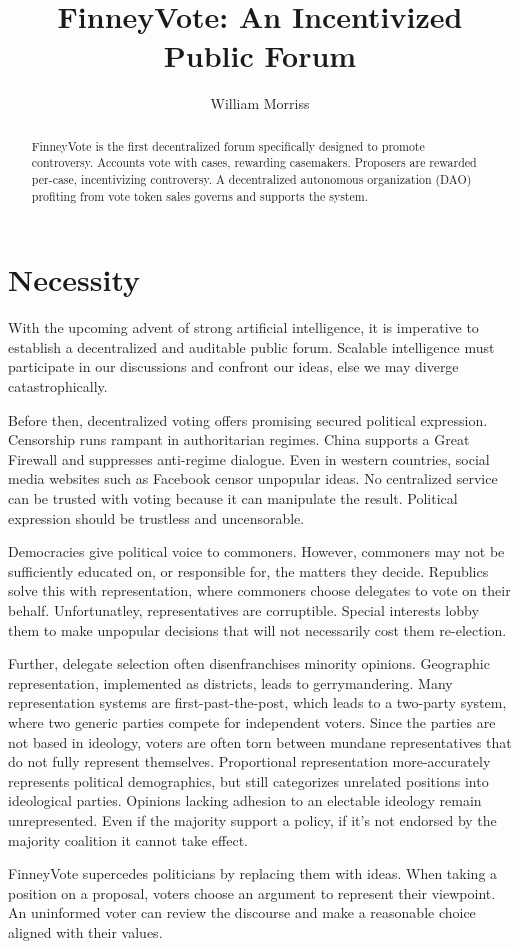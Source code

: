 \documentclass{article}
\title{FinneyVote: An Incentivized Public Forum}
\author{William Morriss}
\begin{document}
\maketitle
\begin{abstract}
FinneyVote is the first decentralized forum specifically designed to promote controversy.
Accounts vote with cases, rewarding casemakers.
Proposers are rewarded per-case, incentivizing controversy.
A decentralized autonomous organization (DAO) profiting from vote token sales governs and supports the system.
\end{abstract}
\section{Necessity}
With the upcoming advent of strong artificial intelligence, it is imperative to establish a decentralized and auditable public forum.
Scalable intelligence must participate in our discussions and confront our ideas, else we may diverge catastrophically.
\par
Before then, decentralized voting offers promising secured political expression.
Censorship runs rampant in authoritarian regimes.
China supports a Great Firewall and suppresses anti-regime dialogue.
Even in western countries, social media websites such as Facebook censor unpopular ideas.
No centralized service can be trusted with voting because it can manipulate the result.
Political expression should be trustless and uncensorable.
\par
Democracies give political voice to commoners.
However, commoners may not be sufficiently educated on, or responsible for, the matters they decide.
Republics solve this with representation, where commoners choose delegates to vote on their behalf.
Unfortunatley, representatives are corruptible.
Special interests lobby them to make unpopular decisions that will not necessarily cost them re-election.
\par
Further, delegate selection often disenfranchises minority opinions.
Geographic representation, implemented as districts, leads to gerrymandering.
Many representation systems are first-past-the-post, which leads to a two-party system, where two generic parties compete for independent voters.
Since the parties are not based in ideology, voters are often torn between mundane representatives that do not fully represent themselves.
Proportional representation more-accurately represents political demographics, but still categorizes unrelated positions into ideological parties.
Opinions lacking adhesion to an electable ideology remain unrepresented.
Even if the majority support a policy, if it's not endorsed by the majority coalition it cannot take effect.
\par
FinneyVote supercedes politicians by replacing them with ideas.
When taking a position on a proposal, voters choose an argument to represent their viewpoint.
An uninformed voter can review the discourse and make a reasonable choice aligned with their values.
\end{document}
